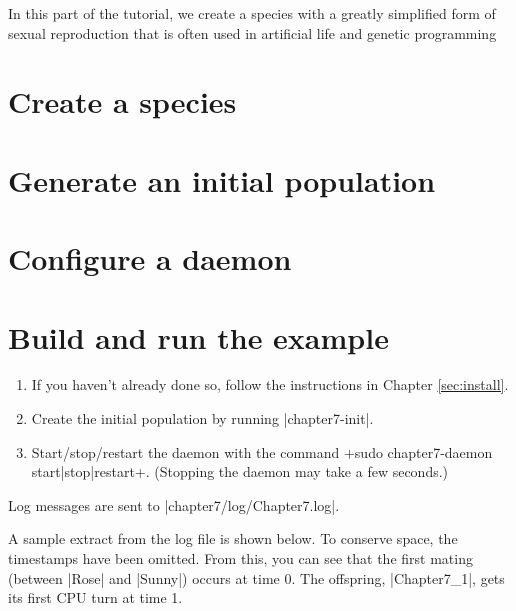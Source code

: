 \documentclass[a4paper,10pt]{report}
\begin{document}
In this part of the tutorial, we create a species with a
greatly simplified form of sexual reproduction that is often
used in artificial life and genetic programming

\section{Create a species}
\label{sec:species2}



\section{Generate an initial population}
\label{sec:pop2}



\section{Configure a daemon}
\label{sec:daemon2}



\section{Build and run the example}
\label{sec:run2}

\begin{enumerate}
\item If you haven't already done so, follow the instructions in Chapter 
\ref{sec:install}.
\item Create the initial population by running |chapter7-init|.
\item Start/stop/restart the daemon with the command
\UndefineShortVerb{\|}
\DefineShortVerb{\+}
+sudo chapter7-daemon start|stop|restart+.
\UndefineShortVerb{\+}
\DefineShortVerb{\|}
(Stopping the daemon may take a few seconds.)
\end{enumerate}

Log messages are sent to |chapter7/log/Chapter7.log|.

A sample extract from the log file is shown below.
To conserve space, the timestamps have been omitted.
From this, you can see that the first mating (between |Rose| and |Sunny|)
occurs at time 0.
The offspring, |Chapter7_1|, gets its first CPU turn at time 1.
\end{document}
